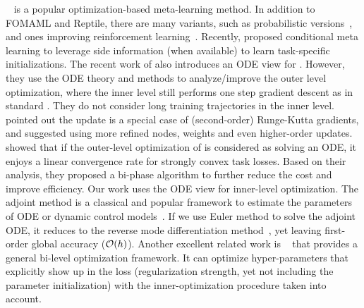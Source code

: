 \maml~\citep{finn2017model} is a popular optimization-based meta-learning method. In addition to FOMAML and Reptile, there are many variants, such as probabilistic versions~\citep{grant2018recasting,yoon2018bayesian,finn2018probabilistic}, and ones improving reinforcement learning~\citep{song2020maml,liu2019taming}. Recently, \citet{denevi2020advantage,wang2020structured,denevi2021conditional} proposed conditional meta learning to leverage side information (when available) to learn task-specific initializations. %
The recent work of \citep{im2019model,xu2021meta} also introduces an ODE view for \maml. However, they use the ODE theory and methods to analyze/improve the outer level optimization, where the inner level still performs one step gradient descent as in standard \maml.  They do not consider long training trajectories in the inner level. \citet{im2019model} pointed out the \maml update is a special case of (second-order) Runge-Kutta gradients, and suggested using more refined nodes, weights and even higher-order updates. \citet{xu2021meta} showed that if the outer-level optimization of \maml is considered as solving an ODE, it enjoys a linear convergence rate for strongly convex task losses. Based on their analysis, they proposed a bi-phase algorithm to further reduce the cost and improve efficiency.  Our work uses the ODE view for inner-level optimization.  The adjoint method is a classical and popular framework to estimate the parameters of ODE or dynamic control models~\citep{chen2018neural,eichmeir2021adjoint}. If we use Euler method to solve the adjoint ODE, it reduces to the reverse mode differentiation method~\citep{bengio2000gradient,baydin2014automatic}, yet leaving first-order global accuracy ($\mathcal{O}(h)$). Another excellent related work is ~\citep{domke2012generic} that provides a general bi-level optimization framework. It can optimize  hyper-parameters that explicitly show up in the loss (\eg regularization strength, yet not including the parameter initialization) with the inner-optimization procedure taken into account.

